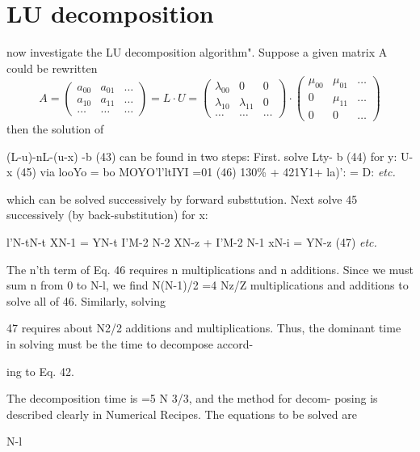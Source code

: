 \section{LU decomposition}
 now investigate the LU decomposition algorithm". Suppose a given matrix A could be rewritten
\begin{equation}
    \label{eq:09_42}
    A = 
    \begin{pmatrix}
        a_{00}&a_{01} &\dots\\
        a_{10}&a_{11} &\dots\\
        \dots&\dots &\dots
    \end{pmatrix}
    = L \cdot U =
    \begin{pmatrix}
        \lambda_{00}&0 &0\\
        \lambda_{10}&\lambda_{11} &0\\
        \dots&\dots &\dots
    \end{pmatrix}
    \cdot
    \begin{pmatrix}
        \mu_{00}&\mu_{01} &\dots\\
        0&\mu_{11} &\dots\\
        0&0 &\dots
    \end{pmatrix}
\end{equation} 
then the solution of

 


(L-u)-nL-(u-x) -b (43)
can be found in two steps: First. solve
Lty- b (44)
for
y: U-x (45)
via
looYo = bo
MOYO'l'ltIYI =01 (46)
130\% + 421Y1+ la)': = D:
\textit{etc.}

which can be solved successively by forward substtution. Next
solve 45 successively (by back-substitution) for x:

l'N-tN-t XN-1 = YN-t
I'M-2 N-2 XN-z + I'M-2 N-1 xN-i = YN-z (47)
\textit{etc.}

The n'th term of Eq. 46 requires n multiplications and n additions.
Since we must sum n from 0 to N-l, we find N(N-1)/2 =4 Nz/Z
multiplications and additions to solve all of 46. Similarly, solving

47 requires about N2/2 additions and multiplications. Thus, the
dominant time in solving must be the time to decompose accord-

ing to Eq. 42.

The decomposition time is =5 N 3/3, and the method for decom-
posing is described clearly in Numerical Recipes. The equations
to be solved are

N-l

